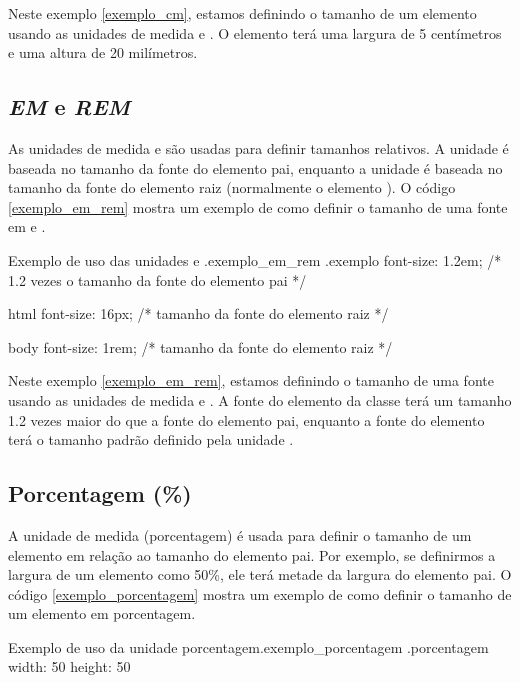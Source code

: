Neste exemplo \ref{exemplo_cm}, estamos definindo o tamanho de um elemento usando as unidades de medida  e . O elemento terá uma largura de 5 centímetros e uma altura de 20 milímetros.

\subsection{\textit{EM} e \textit{REM}}

As unidades de medida  e  são usadas para definir tamanhos relativos. A unidade  é baseada no tamanho da fonte do elemento pai, enquanto a unidade  é baseada no tamanho da fonte do elemento raiz (normalmente o elemento ). O código \ref{exemplo_em_rem} mostra um exemplo de como definir o tamanho de uma fonte em  e .

\begin{csscode}{Exemplo de uso das unidades  e .}{exemplo_em_rem}
.exemplo {
    font-size: 1.2em; /* 1.2 vezes o tamanho da fonte do elemento pai */
}

html {
    font-size: 16px; /* tamanho da fonte do elemento raiz */
}

body {
    font-size: 1rem; /* tamanho da fonte do elemento raiz */
}
\end{csscode}

Neste exemplo \ref{exemplo_em_rem}, estamos definindo o tamanho de uma fonte usando as unidades de medida  e . A fonte do elemento da classe  terá um tamanho 1.2 vezes maior do que a fonte do elemento pai, enquanto a fonte do elemento  terá o tamanho padrão definido pela unidade .

\subsection{Porcentagem (\%)}

A unidade de medida \var{\%} (porcentagem) é usada para definir o tamanho de um elemento em relação ao tamanho do elemento pai. Por exemplo, se definirmos a largura de um elemento como 50\%, ele terá metade da largura do elemento pai. O código \ref{exemplo_porcentagem} mostra um exemplo de como definir o tamanho de um elemento em porcentagem.

\begin{csscode}{Exemplo de uso da unidade porcentagem.}{exemplo_porcentagem}
.porcentagem {
    width: 50%
    height: 50%
}
\end{csscode}


